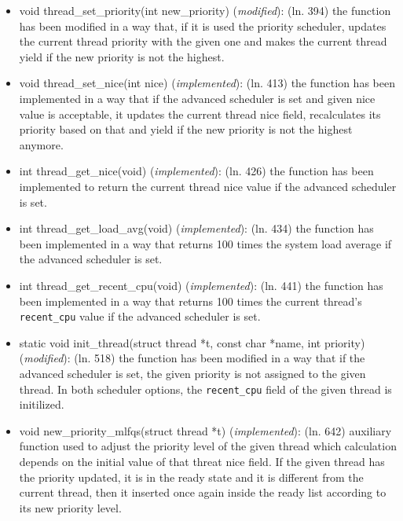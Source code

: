 \documentclass[11pt]{scrartcl}
\begin{document}
\begin{itemize}
	\item void thread\_set\_priority(int new\_priority) (\textit{modified}): \newline 
	(ln. 394) the function has been modified in a way that, if it is used the priority scheduler, updates the current thread priority with the given one and makes the current thread yield if the new priority is not the highest.
	
	\item void thread\_set\_nice(int nice) (\textit{implemented}): \newline 
	(ln. 413) the function has been implemented in a way that if the advanced scheduler is set and given nice value is acceptable, it updates the current thread nice field, recalculates its priority based on that and yield if the new priority is not the highest anymore.
	\item  int thread\_get\_nice(void) (\textit{implemented}): \newline 
	(ln. 426) the function has been implemented to return the current thread nice value if the advanced scheduler is set.
	\item int thread\_get\_load\_avg(void) (\textit{implemented}): \newline
	(ln. 434) the function has been implemented in a way that returns 100 times the system load average if the advanced scheduler is set.
	\item int thread\_get\_recent\_cpu(void) (\textit{implemented}): \newline
	(ln. 441) the function has been implemented in a way that returns 100 times the current thread's \texttt{recent\_cpu} value if the advanced scheduler is set.
	\item static void init\_thread(struct thread *t, const char *name, int priority) (\textit{modified}): \newline
	(ln. 518) the function has been modified in a way that if the advanced scheduler is set, the given priority is not assigned to the given thread. In both scheduler options, the \texttt{recent\_cpu} field of the given thread is initilized.
	\item void new\_priority\_mlfqs(struct thread *t) (\textit{implemented}): \newline
	(ln. 642) auxiliary function used to adjust the priority level of the given thread which calculation depends on the initial value of that threat nice field. 
	If the given thread has the priority updated, it is in the ready state and it is different from the current thread, then it inserted once again inside the ready list according to its new priority level.
	

\end{itemize}
\end{document}
